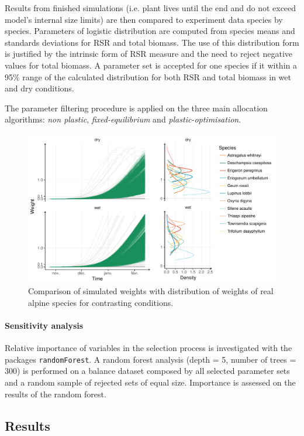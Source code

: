 Results from finished simulations (i.e. plant lives until the end and do not exceed model's internal size limits) are then compared to experiment data species by species. Parameters of logistic distribution are computed from species means and standards deviations for RSR and total biomass. The use of this distribution form is justified by the intrinsic form of RSR measure and the need to reject negative values for total biomass. A parameter set is accepted for one species if it within a 95\% range of the calculated distribution for both RSR and total biomass in wet and dry conditions.

The parameter filtering procedure is applied on the three main allocation algorithms: \textit{non plastic}, \textit{fixed-equilibrium} and \textit{plastic-optimisation}.

\begin{figure}\label{fig:comparison_BM}
\includegraphics[width = \textwidth]{./2_PP/Figures/Calibration/weight_full_sim.pdf}
\caption{Comparison of simulated weights with distribution of weights of real alpine species for contrasting conditions.}
\end{figure}

\paragraph{Sensitivity analysis}
Relative importance of variables in the selection process is investigated with the packages \texttt{randomForest}. A random forest analysis (depth = 5, number of trees = 300) is performed on a balance dataset composed by all selected parameter sets and a random sample of rejected sets of equal size. Importance is assessed on the results of the random forest.

\subsection{Results}

